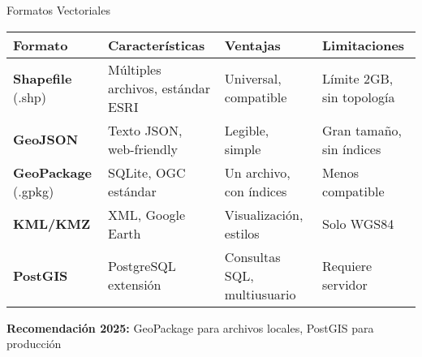 \documentclass[10pt]{beamer}
\begin{document}
\begin{frame}{Formatos Vectoriales}
    \begin{tabular}{|l|p{3cm}|p{3cm}|p{3cm}|}
        \hline
        \textbf{Formato} & \textbf{Características} & \textbf{Ventajas} & \textbf{Limitaciones} \\
        \hline
        \textbf{Shapefile} (.shp) & 
        Múltiples archivos, estándar ESRI & 
        Universal, compatible & 
        Límite 2GB, sin topología \\
        \hline
        \textbf{GeoJSON} & 
        Texto JSON, web-friendly & 
        Legible, simple & 
        Gran tamaño, sin índices \\
        \hline
        \textbf{GeoPackage} (.gpkg) & 
        SQLite, OGC estándar & 
        Un archivo, con índices & 
        Menos compatible \\
        \hline
        \textbf{KML/KMZ} & 
        XML, Google Earth & 
        Visualización, estilos & 
        Solo WGS84 \\
        \hline
        \textbf{PostGIS} & 
        PostgreSQL extensión & 
        Consultas SQL, multiusuario & 
        Requiere servidor \\
        \hline
    \end{tabular}
    
    \vspace{0.3cm}
    
    \begin{tcolorbox}[colframe=usachblue,colback=blue!5]
        \small
        \textbf{Recomendación 2025:} GeoPackage para archivos locales, PostGIS para producción
    \end{tcolorbox}
\end{frame}
\end{document}
